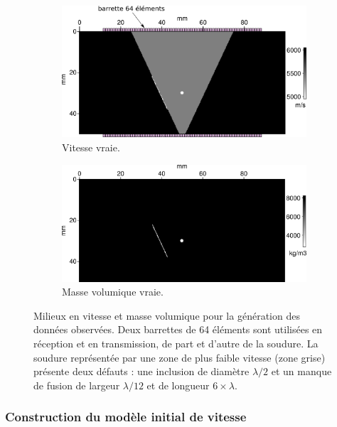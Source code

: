 \begin{figure}[!h]
	\centering
	\begin{subfigure}[b]{0.45\textwidth}
		\includegraphics[width=\textwidth]{img/milieux_ps/vp_true.png}
		\caption{Vitesse vraie.}
	\end{subfigure}
	\begin{subfigure}[b]{0.45\textwidth}
		\includegraphics[width=\textwidth]{img/milieux_ps/rho_true.png}
		\caption{Masse volumique vraie.}
	\end{subfigure}
	\caption{Milieux en vitesse et masse volumique pour la génération des données observées. Deux barrettes de 64 éléments sont utilisées en réception et en transmission, de part et d'autre de la soudure. La soudure représentée par une zone de plus faible vitesse (zone grise) présente deux défauts : une inclusion de diamètre $\lambda/2$ et un manque de fusion de largeur $\lambda/12$ et de longueur $6\times \lambda$.\label{app:iso:model}}
\end{figure}

\subsubsection{Construction du modèle initial de vitesse}

